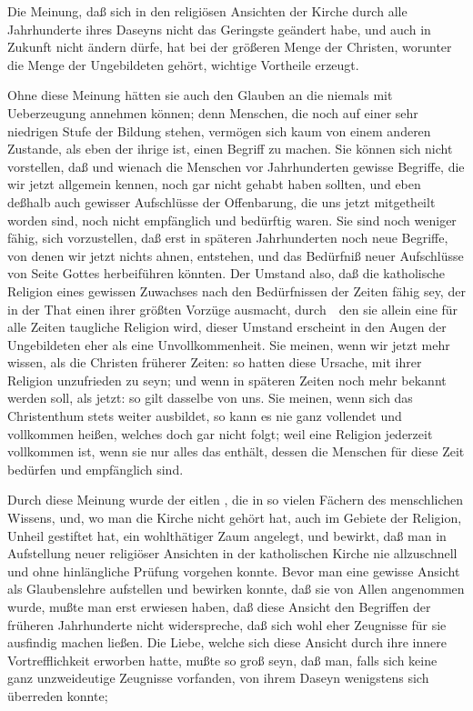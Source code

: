\begin{aufza}
\item Die Meinung, daß sich in den religiösen Ansichten der Kirche durch alle Jahrhunderte ihres Daseyns nicht das Geringste geändert habe, und auch in Zukunft nicht ändern dürfe, hat bei der größeren Menge der Christen, worunter die Menge der Ungebildeten gehört, wichtige Vortheile erzeugt.
\begin{aufzb}
\item Ohne diese Meinung hätten sie auch den Glauben an die  niemals mit Ueberzeugung annehmen können; denn Menschen, die noch auf einer sehr niedrigen Stufe der Bildung stehen, vermögen sich kaum von einem anderen Zustande, als eben der ihrige ist, einen Begriff zu machen. Sie können sich nicht vorstellen, daß und wienach die Menschen vor Jahrhunderten gewisse Begriffe, die wir jetzt allgemein kennen, noch gar nicht gehabt haben sollten, und eben deßhalb auch gewisser Aufschlüsse der Offenbarung, die uns jetzt mitgetheilt worden sind, noch nicht empfänglich und bedürftig waren. Sie sind noch weniger fähig, sich vorzustellen, daß erst in späteren Jahrhunderten noch neue Begriffe, von denen wir jetzt nichts ahnen, entstehen, und das Bedürfniß neuer Aufschlüsse von Seite Gottes herbeiführen könnten. Der Umstand also, daß die katholische Religion eines gewissen Zuwachses nach den Bedürfnissen der Zeiten fähig sey, der in der That einen ihrer größten Vorzüge ausmacht, durch~\ den sie allein eine für alle Zeiten taugliche Religion wird, dieser Umstand erscheint in den Augen der Ungebildeten eher als eine Unvollkommenheit. Sie meinen, wenn wir jetzt mehr wissen, als die Christen früherer Zeiten: so hatten diese Ursache, mit ihrer Religion unzufrieden zu seyn; und wenn in späteren Zeiten noch mehr bekannt werden soll, als jetzt: so gilt dasselbe von uns. Sie meinen, wenn sich das Christenthum stets weiter ausbildet, so kann es nie ganz vollendet und vollkommen heißen, welches doch gar nicht folgt; weil eine Religion jederzeit vollkommen ist, wenn sie nur alles das enthält, dessen die Menschen für diese Zeit bedürfen und empfänglich sind.
\item Durch diese Meinung wurde der eitlen , die in so vielen Fächern des menschlichen Wissens, und, wo man die Kirche nicht gehört hat, auch im Gebiete der Religion, Unheil gestiftet hat, ein wohlthätiger Zaum angelegt, und bewirkt, daß man in Aufstellung neuer religiöser Ansichten in der katholischen Kirche nie allzuschnell und ohne hinlängliche Prüfung vorgehen konnte. Bevor man eine gewisse Ansicht als Glaubenslehre aufstellen und bewirken konnte, daß sie von Allen angenommen wurde, mußte man erst erwiesen haben, daß diese Ansicht den Begriffen der früheren Jahrhunderte nicht widerspreche, daß sich wohl eher Zeugnisse für sie ausfindig machen ließen. Die Liebe, welche sich diese Ansicht durch ihre innere Vortrefflichkeit erworben hatte, mußte so groß seyn, daß man, falls sich keine ganz unzweideutige Zeugnisse vorfanden, von ihrem Daseyn wenigstens sich überreden konnte; \usw

\end{aufzb}
\end{aufza}

